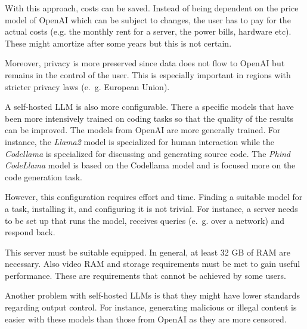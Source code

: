 With this approach, costs can be saved. Instead of being dependent on the price model of OpenAI which can be subject to changes, the user has to pay for the actual costs (e.g. the monthly rent for a server, the power bills, hardware etc). These might amortize after some years but this is not certain.

Moreover, privacy is more preserved since data does not flow to OpenAI but remains in the control of the user. This is especially important in regions with stricter privacy laws (e.~g. European Union).

A self-hosted \ac{LLM} is also more configurable. There a specific models that have been more intensively trained on coding tasks so that the quality of the results can be improved. The models from OpenAI are more generally trained.  For instance, the \textit{Llama2} model is specialized for human interaction while the \textit{Codellama} is specialized for discussing and generating source code. The \textit{Phind CodeLlama} model is based on the Codellama model and is focused more on the code generation task. 

However, this configuration requires effort and time. Finding a suitable model for a task, installing it, and configuring it is not trivial. For instance, a server needs to be set up that  runs the model, receives queries (e.~g. over a network) and respond back. 

This server must be suitable equipped. In general, at least 32 GB of RAM are necessary. Also video RAM and storage requirements must be met to gain useful performance. These are requirements that cannot be achieved by some users. 




Another problem with self-hosted \acp{LLM} is that they might have lower standards regarding output control. For instance, generating malicious or illegal content is easier with these models than those from OpenAI as they are more censored. 


